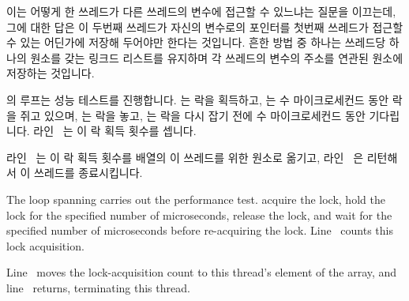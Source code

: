 {{	이는 어떻게 한 쓰레드가 다른 쓰레드의  변수에 접근할 수
	있느냐는 질문을 이끄는데, 그에 대한 답은 이 두번째 쓰레드가 자신의
	 변수로의 포인터를 첫번째 쓰레드가 접근할 수 있는
	어딘가에 저장해 두어야만 한다는 것입니다.
	흔한 방법 중 하나는 쓰레드당 하나의 원소를 갖는 링크드 리스트를
	유지하며 각 쓰레드의  변수의 주소를 연관된 원소에
	저장하는 것입니다.

}\QuickQuizEndE
}

\begin{fcvref}
 의 루프는 성능 테스트를 진행합니다.
 는 락을 획득하고,  는 수
마이크로세컨드 동안 락을 쥐고 있으며,  는 락을 놓고,
 는 락을 다시 잡기 전에 수 마이크로세컨드 동안
기다립니다.
라인~ 는 이 락 획득 횟수를 셉니다.

라인~ 는 이 락 획득 횟수를  배열의 이 쓰레드를
위한 원소로 옮기고, 라인~ 은 리턴해서 이 쓰레드를 종료시킵니다.
\end{fcvref}

\iffalse

\begin{fcvref}
The loop spanning  carries out the performance test.
 acquire the lock,
 hold the lock for the specified
number of microseconds,
 release the lock,
and  wait for the specified
number of microseconds before re-acquiring the lock.
Line~ counts this lock acquisition.

Line~ moves the lock-acquisition count to this thread's element of the
 array, and line~ returns, terminating this thread.
\end{fcvref}

